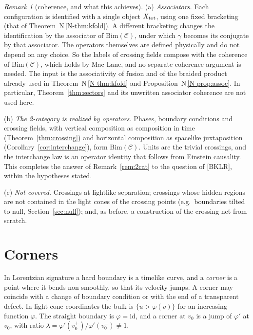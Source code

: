 \documentclass[11pt]{article}
\theoremstyle{definition}
\theoremstyle{remark}
\newtheorem{remark}[theorem]{Remark}
\newcommand{\nref}[1]{N\,\ref{N-#1}}
\begin{document}
\begin{remark}[coherence, and what this achieves]\label{rem:horizontal}
(a) \emph{Associators.} Each configuration is identified with a single object $X_{\rm tot}$, using one fixed bracketing (that of Theorem~\nref{thm:kfold}). A different bracketing changes the identification by the associator of $\mathrm{Bim}(\mathcal C)$, under which $\gamma$ becomes its conjugate by that associator. The operators themselves are defined physically and do not depend on any choice. So the labels of crossing fields compose with the coherence of $\mathrm{Bim}(\mathcal C)$, which holds by Mac Lane, and no separate coherence argument is needed. The input is the associativity of fusion and of the braided product already used in Theorem~\nref{thm:kfold} and Proposition~\nref{prop:assoc}. In particular, Theorem~\ref{thm:sectors} and its unwritten associator coherence are not used here.

(b) \emph{The 2-category is realized by operators.} Phases, boundary conditions and crossing fields, with vertical composition as composition in time (Theorem~\ref{thm:crossing}) and horizontal composition as spacelike juxtaposition (Corollary~\ref{cor:interchange}), form $\mathrm{Bim}(\mathcal C)$. Units are the trivial crossings, and the interchange law is an operator identity that follows from Einstein causality. This completes the answer of Remark~\ref{rem:2cat} to the question of [BKLR], within the hypotheses stated.

(c) \emph{Not covered.} Crossings at lightlike separation; crossings whose hidden regions are not contained in the light cones of the crossing points (e.g.\ boundaries tilted to null, Section~\ref{sec:null}); and, as before, a construction of the crossing net from scratch.
\end{remark}

\section{Corners}\label{sec:corners}
In Lorentzian signature a hard boundary is a timelike curve, and a \emph{corner} is a point where it bends non-smoothly, so that its velocity jumps. A corner may coincide with a change of boundary condition or with the end of a transparent defect. In light-cone coordinates the bulk is $\{u>\varphi(v)\}$ for an increasing function $\varphi$. The straight boundary is $\varphi=\mathrm{id}$, and a corner at $v_0$ is a jump of $\varphi'$ at $v_0$, with ratio $\lambda=\varphi'(v_0^+)/\varphi'(v_0^-)\ne1$.
\end{document}
